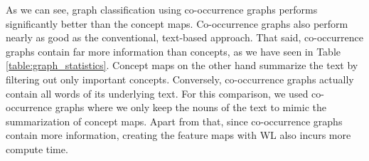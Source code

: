 As we can see, graph classification using co-occurrence graphs performs significantly better than the concept maps.
Co-occurrence graphs also perform nearly as good as the conventional, text-based approach.
That said, co-occurrence graphs contain far more information than concepts, as we have seen in Table \ref{table:graph_statistics}.
Concept maps on the other hand summarize the text by filtering out only important concepts.
Conversely, co-occurrence graphs actually contain all words of its underlying text.
For this comparison, we used co-occurrence graphs where we only keep the nouns of the text to mimic the summarization of concept maps.
Apart from that, since co-occurrence graphs contain more information, creating the feature maps with WL also incurs more compute time.

